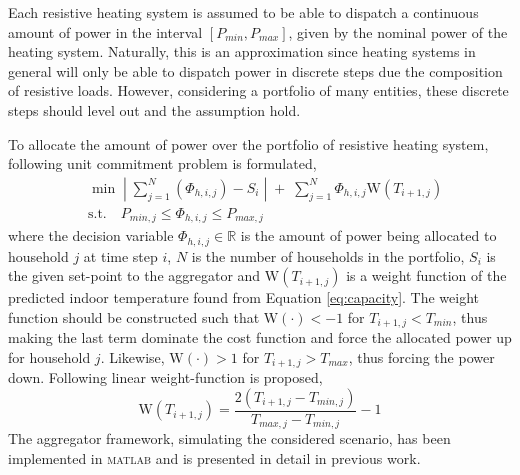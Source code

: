 Each resistive heating system is assumed to be able to dispatch a continuous amount of power in the interval $\left[P_{min}, P_{max}\right]$, given by the nominal power of the heating system. Naturally, this is an approximation since heating systems in general will only be able to dispatch power in discrete steps due the composition of resistive loads. However, considering a portfolio of many entities, these discrete steps should level out and the assumption hold. 

To allocate the amount of power over the portfolio of resistive heating system, following unit commitment problem is formulated,
\begin{align}\label{eq:agg_dispatch}
  & \min\;\left|\; \sum_{j=1}^N \left(\Phi_{h,i,j}\right) - S_i \;\right|\; + \; \sum^{N}_{j=1}\Phi_{h,i,j}\mbox{W}\left(T_{i+1,j}\right)	\\[5mm]\nonumber
  & \mbox{s.t.} \quad P_{min,j} \leq \Phi_{h,i,j} \leq P_{max,j}  
\end{align}
where the decision variable  $\Phi_{h,i,j}\in\mathbb{R}$ is the amount of power being allocated to household $j$ at time step $i$, $N$ is the number of households in the portfolio, $S_i$ is the given set-point to the aggregator and $\mbox{W}\left(T_{i+1,j}\right)$ is a weight function of the predicted indoor temperature found from Equation \eqref{eq:capacity}. The weight function should be constructed such that $\mbox{W}\left(\cdot\right)<-1$ for $T_{i+1,j} < T_{min}$, thus making the last term dominate the cost function and force the allocated power up for household $j$. Likewise, $\mbox{W}\left(\cdot\right)>1$ for $T_{i+1,j} > T_{max}$, thus forcing the power down. Following linear weight-function is proposed,
\begin{equation}\label{eq:weight_fct}
  \mbox{W}\left(T_{i+1,j}\right) = \frac{2\left(T_{i+1,j}-T_{min,j} \right)}{T_{max,j} - T_{min,j}}-1 
\end{equation}
The aggregator framework, simulating the considered scenario, has been implemented in \textsc{matlab} and is presented in detail in previous work\cite{thavlov2013aggregation}.

